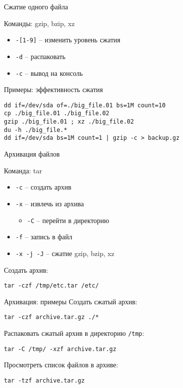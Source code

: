 \begin{frame}[fragile]{Сжатие одного файла}

	\begin{block}{Команды: gzip, bzip, xz}
		\begin{itemize}
			\item {\tt -[1-9]} -- изменить уровень сжатия
			\item {\tt -d} -- распаковать
			\item {\tt -c} -- вывод на консоль
		\end{itemize}
	\end{block}

	\begin{block}{Примеры: эффективность сжатия}
		\begin{verbatim}
dd if=/dev/sda of=./big_file.01 bs=1M count=10
cp ./big_file.01 ./big_file.02
gzip ./big_file.01 ; xz ./big_file.02
du -h ./big_file.*
dd if=/dev/sda bs=1M count=1 | gzip -c > backup.gz
    \end{verbatim}
	\end{block}
\end{frame}

\begin{frame}[fragile]{Архивация файлов}
	\begin{block}{Команда: tar}
		\begin{itemize}
			\item {\tt -c} -- создать архив
			\item {\tt -x} -- извлечь из архива
				\begin{itemize}
					\item {\tt -C} -- перейти в директорию
				\end{itemize}
			\item {\tt -f} -- запись в файл
			\item {\tt -x -j -J} -- сжатие gzip, bzip, xz
		\end{itemize}
	\end{block}
	Создать архив:
	\begin{verbatim}
tar -czf /tmp/etc.tar /etc/
        \end{verbatim}
\end{frame}

\begin{frame}[fragile]{Архивация: примеры}
	Создать сжатый архив:
	\begin{verbatim}
tar -czf archive.tar.gz ./*
        \end{verbatim}
	\pause
	Распаковать сжатый архив в директорию {\tt /tmp}:
	\begin{verbatim}
tar -C /tmp/ -xzf archive.tar.gz
        \end{verbatim}
	\pause
	Просмотреть список файлов в архиве:
	\begin{verbatim}
tar -tzf archive.tar.gz
        \end{verbatim}
\end{frame}
